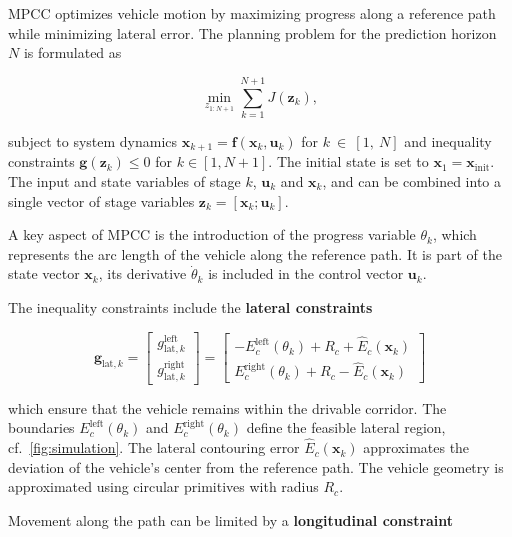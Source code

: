 \gls{MPCC} optimizes vehicle motion by maximizing progress along a reference path while minimizing lateral error.
The planning problem for the prediction horizon $N$ is formulated as

\begin{equation}
\min_{z_{1:N+1}} \sum_{k=1}^{N+1} J(\boldsymbol{z}_k),
\end{equation}

subject to system dynamics $\boldsymbol{x}_{k+1} = \mathbf{f}(\boldsymbol{x}_k,\boldsymbol{u}_k)$ for $k~\in~[1,~N]$
and inequality constraints $\boldsymbol{g}(\boldsymbol{z}_k) \leq 0$ for $k \in [1, N+1]$.
The initial state is set to $\boldsymbol{x}_1 = \boldsymbol{x}_\text{init}$.
The input and state variables of stage $k$, $\boldsymbol{u}_k$ and $\boldsymbol{x}_k$, and can be combined into a single vector of stage variables $\boldsymbol{z}_k = [\boldsymbol{x}_k; \boldsymbol{u}_k]$.

A key aspect of MPCC is the introduction of the progress variable $\theta_k$, which represents the arc length of the vehicle along the reference path.
It is part of the state vector $\boldsymbol{x}_k$, its derivative $\dot{\theta}_k$ is included in the control vector $\boldsymbol{u}_k$.

The inequality constraints include the \textbf{lateral constraints}

\begin{equation}
    \boldsymbol{g}_{\text{lat},k} = 
    \begin{bmatrix}
    g_{\text{lat},k}^\text{left} \\
    g_{\text{lat},k}^\text{right}
    \end{bmatrix}
    =
    \begin{bmatrix}
    - E_c^\text{left}(\theta_k) + R_c + \hat{E}_c(\boldsymbol{x}_k) \\
    E_c^\text{right}(\theta_k) + R_c - \hat{E}_c(\boldsymbol{x}_k)
    \end{bmatrix}
\end{equation}

which ensure that the vehicle remains within the drivable corridor.
The boundaries $E_c^\text{left}(\theta_k)$ and $E_c^\text{right}(\theta_k)$ define the feasible lateral region, cf.~\cref{fig:simulation}.
The lateral contouring error $\hat{E}_c(\boldsymbol{x}_k)$ approximates the deviation of the vehicle’s center from the reference path.
The vehicle geometry is approximated using circular primitives with radius $R_c$.

Movement along the path can be limited by a \textbf{longitudinal constraint}

